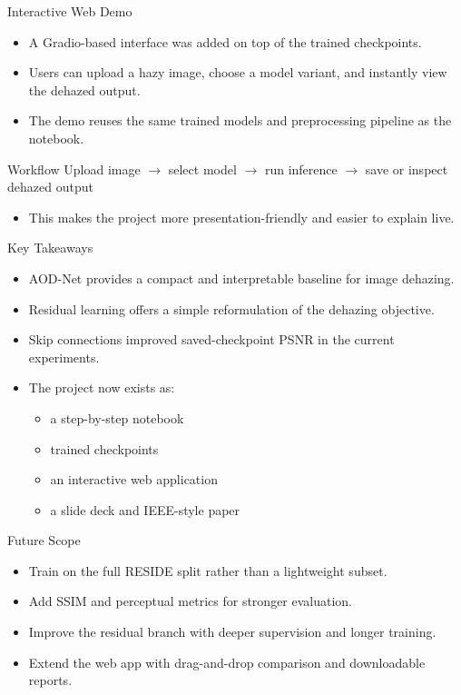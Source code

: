 \documentclass[aspectratio=169]{beamer}
\begin{document}
\begin{frame}{Interactive Web Demo}
  \begin{itemize}
    \item A Gradio-based interface was added on top of the trained checkpoints.
    \item Users can upload a hazy image, choose a model variant, and instantly view the dehazed output.
    \item The demo reuses the same trained models and preprocessing pipeline as the notebook.
  \end{itemize}

  \begin{block}{Workflow}
    Upload image \(\rightarrow\) select model \(\rightarrow\) run inference \(\rightarrow\) save or inspect dehazed output
  \end{block}

  \begin{itemize}
    \item This makes the project more presentation-friendly and easier to explain live.
  \end{itemize}
\end{frame}

\begin{frame}{Key Takeaways}
  \begin{itemize}
    \item AOD-Net provides a compact and interpretable baseline for image dehazing.
    \item Residual learning offers a simple reformulation of the dehazing objective.
    \item Skip connections improved saved-checkpoint PSNR in the current experiments.
    \item The project now exists as:
    \begin{itemize}
      \item a step-by-step notebook
      \item trained checkpoints
      \item an interactive web application
      \item a slide deck and IEEE-style paper
    \end{itemize}
  \end{itemize}
\end{frame}

\begin{frame}{Future Scope}
  \begin{itemize}
    \item Train on the full RESIDE split rather than a lightweight subset.
    \item Add SSIM and perceptual metrics for stronger evaluation.
    \item Improve the residual branch with deeper supervision and longer training.
    \item Extend the web app with drag-and-drop comparison and downloadable reports.
  \end{itemize}
\end{frame}
\end{document}
